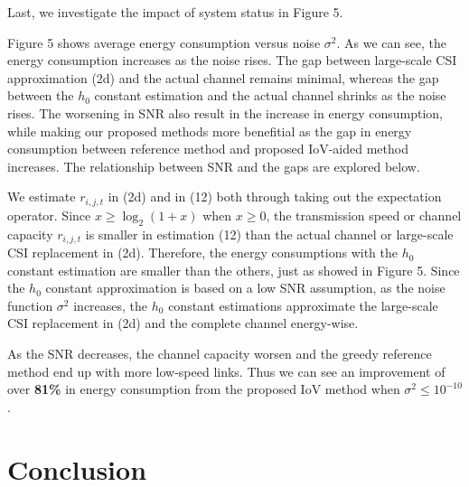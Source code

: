 \documentclass{ieeeaccess}
\begin{document}
Last, we investigate the impact of system status in Figure 5.

Figure 5 shows average energy consumption versus noise ${\sigma ^2}$. As we can see, the energy consumption increases as the noise rises. The gap between large-scale CSI approximation (2d) and the actual channel remains minimal, whereas the gap between the ${h_0}$ constant estimation and the actual channel shrinks as the noise rises. %
The worsening in SNR also result in the increase in energy consumption, while making our proposed methods more benefitial as the gap in energy consumption between reference method and proposed IoV-aided method increases. The relationship between SNR and the gaps are explored below. 

We estimate ${r_{i,j,t}}$ in (2d) and in (12) both through taking out the expectation operator. Since $x \ge {\log _2}\left( {1 + x} \right)$ when ${x \ge 0}$, the transmission speed or channel capacity ${r_{i,j,t}}$ is smaller in estimation (12) than the actual channel or large-scale CSI replacement in (2d). Therefore, the energy consumptions with the ${h_0}$ constant estimation are smaller than the others, just as showed in Figure 5. 
Since the ${h_0}$ constant approximation is based on a low SNR assumption, as the noise function ${\sigma ^2}$ increases, the ${h_0}$ constant estimations approximate the large-scale CSI replacement in (2d) and the complete channel energy-wise.

As the SNR decreases, the channel capacity worsen and the greedy reference method end up with more low-speed links. Thus we can see an improvement of over \textbf{81\%} in energy consumption from the proposed IoV method when ${\sigma ^2 \le{10^{ - 10}}}$.


\section{Conclusion}\label{sec:4}
\end{document}
